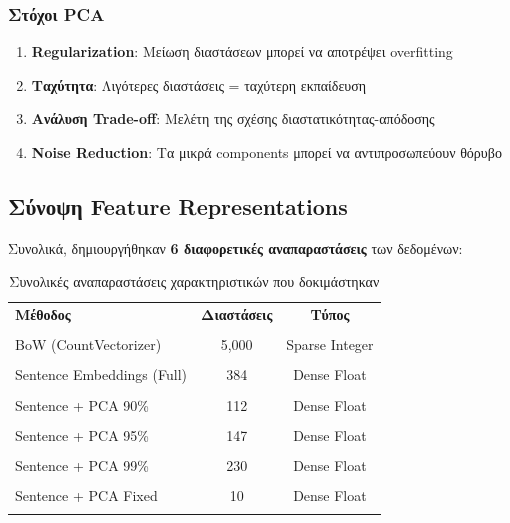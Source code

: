 \documentclass[12pt,a4paper,twoside]{book}
\begin{document}
\subsubsection*{Στόχοι PCA}

\begin{enumerate}
    \item \textbf{Regularization}: Μείωση διαστάσεων μπορεί να αποτρέψει overfitting
    \item \textbf{Ταχύτητα}: Λιγότερες διαστάσεις = ταχύτερη εκπαίδευση
    \item \textbf{Ανάλυση Trade-off}: Μελέτη της σχέσης διαστατικότητας-απόδοσης
    \item \textbf{Noise Reduction}: Τα μικρά components μπορεί να αντιπροσωπεύουν θόρυβο
\end{enumerate}

\subsection{Σύνοψη Feature Representations}

Συνολικά, δημιουργήθηκαν \textbf{6 διαφορετικές αναπαραστάσεις} των δεδομένων:

\begin{table}[h]
    \centering
    \begin{tabular}{lcc}
        \hline
        \textbf{Μέθοδος}           & \textbf{Διαστάσεις} & \textbf{Τύπος} \\\\
        \hline
        BoW (CountVectorizer)      & 5,000               & Sparse Integer \\\\
        Sentence Embeddings (Full) & 384                 & Dense Float    \\\\
        Sentence + PCA 90\%        & 112                 & Dense Float    \\\\
        Sentence + PCA 95\%        & 147                 & Dense Float    \\\\
        Sentence + PCA 99\%        & 230                 & Dense Float    \\\\
        Sentence + PCA Fixed       & 10                  & Dense Float    \\\\
        \hline
    \end{tabular}
    \caption{Συνολικές αναπαραστάσεις χαρακτηριστικών που δοκιμάστηκαν}
\end{table}
\end{document}
